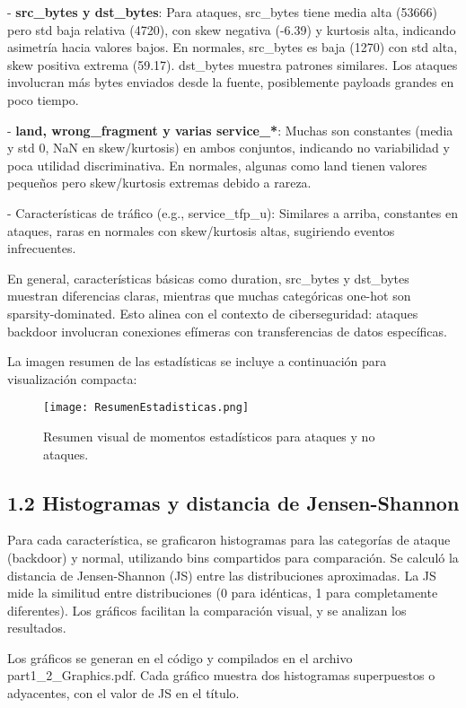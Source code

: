 \documentclass{article}
\begin{document}
- \textbf{src\_bytes y dst\_bytes}: Para ataques, src\_bytes tiene media alta (53666) pero std baja relativa (4720), con skew negativa (-6.39) y kurtosis alta, indicando asimetría hacia valores bajos. En normales, src\_bytes es baja (1270) con std alta, skew positiva extrema (59.17). dst\_bytes muestra patrones similares. Los ataques involucran más bytes enviados desde la fuente, posiblemente payloads grandes en poco tiempo.

- \textbf{land, wrong\_fragment y varias service\_*}: Muchas son constantes (media y std 0, NaN en skew/kurtosis) en ambos conjuntos, indicando no variabilidad y poca utilidad discriminativa. En normales, algunas como land tienen valores pequeños pero skew/kurtosis extremas debido a rareza.

- Características de tráfico (e.g., service\_tfp\_u): Similares a arriba, constantes en ataques, raras en normales con skew/kurtosis altas, sugiriendo eventos infrecuentes.

En general, características básicas como duration, src\_bytes y dst\_bytes muestran diferencias claras, mientras que muchas categóricas one-hot son sparsity-dominated. Esto alinea con el contexto de ciberseguridad: ataques backdoor involucran conexiones efímeras con transferencias de datos específicas.

La imagen resumen de las estadísticas se incluye a continuación para visualización compacta:

\begin{figure}[H]
\centering
\texttt{[image: ResumenEstadisticas.png]}
\caption{Resumen visual de momentos estadísticos para ataques y no ataques.}
\label{fig:resumenestadisticas}
\end{figure}

\subsection{1.2 Histogramas y distancia de Jensen-Shannon}

Para cada característica, se graficaron histogramas para las categorías de ataque (backdoor) y normal, utilizando bins compartidos para comparación. Se calculó la distancia de Jensen-Shannon (JS) entre las distribuciones aproximadas. La JS mide la similitud entre distribuciones (0 para idénticas, 1 para completamente diferentes). Los gráficos facilitan la comparación visual, y se analizan los resultados.

Los gráficos se generan en el código y compilados en el archivo part1\_2\_Graphics.pdf. Cada gráfico muestra dos histogramas superpuestos o adyacentes, con el valor de JS en el título.
\end{document}
